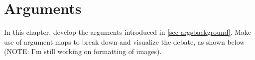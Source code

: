 \chapter{Arguments}
\label{chap-arguments}

In this chapter, develop the arguments introduced in \ref{sec-argsbackground}. Make use of argument maps to break down
and visualize the debate, as shown below (NOTE: I'm still working on formatting of images).


